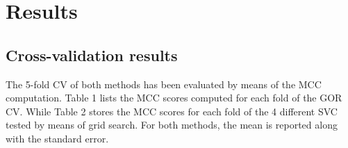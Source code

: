 \documentclass[nocrop]{bioinfo}
\begin{document}
\section{Results}
\subsection{Cross-validation results}
The 5-fold CV of both methods has been evaluated by means of the MCC computation. Table 1 lists the MCC scores computed for each fold of the GOR CV. While Table 2 stores the MCC scores for each fold of the 4 different SVC tested by means of grid search. For both methods, the mean is reported along with the standard error. 

\begin{table}[!tbh]
\centering
{}
\vspace{+10pt}
\caption{5-fold cross-validation MCC values, mean and standard error of GOR model.}
\label{Tab:01}
\end{table}

\begin{table}[!tbh]
\centering
{}
\vspace{+10pt}
\caption{5-fold cross-validation MCC values, mean and standard errors for each SVC tested by means of grid search.}
\label{Tab:02}
\end{table}
\end{document}
